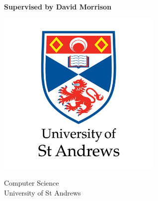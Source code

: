 \begin{titlepage}
    \begin{center}
    \begin{Large}
        \vspace*{1cm}

        {\Huge \textbf{\Title} \par}

        \vspace{0.5cm}
        \Subtitle
            
        \vspace{1.5cm}

        \textbf{\large \Author\\Supervised by David Morrison}

        \vspace{0pt plus 0.75fill}
       
        \includegraphics[width=0.6\textwidth]{Template/university-of-st-andrews-logo.png}
        
        \vfill
       
        Computer Science\\
        University of St Andrews\\
        \Date
            
    \end{Large}
    \end{center}
\end{titlepage}